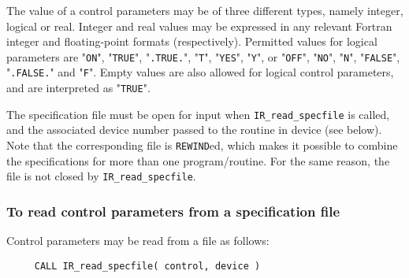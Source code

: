 \documentclass{galahad}
\newcommand{\packagename}{IR}
\begin{document}
The value of a control parameters may be of three different types, namely
integer, logical or real.
Integer and real values may be expressed in any relevant Fortran integer and
floating-point formats (respectively). Permitted values for logical
parameters are "{\tt ON}", "{\tt TRUE}", "{\tt .TRUE.}", "{\tt T}",
"{\tt YES}", "{\tt Y}", or "{\tt OFF}", "{\tt NO}",
"{\tt N}", "{\tt FALSE}", "{\tt .FALSE.}" and "{\tt F}".
Empty values are also allowed for
logical control parameters, and are interpreted as "{\tt TRUE}".

The specification file must be open for
input when {\tt \packagename\_read\_specfile}
is called, and the associated device number
passed to the routine in device (see below).
Note that the corresponding
file is {\tt REWIND}ed, which makes it possible to combine the specifications
for more than one program/routine.  For the same reason, the file is not
closed by {\tt \packagename\_read\_specfile}.

\subsubsection{To read control parameters from a specification file}
\label{readspec}

Control parameters may be read from a file as follows:
\hskip0.5in
\def\baselinestretch{0.8} {\tt \begin{verbatim}
     CALL IR_read_specfile( control, device )
\end{verbatim}}
\def\baselinestretch{1.0}
\end{document}
